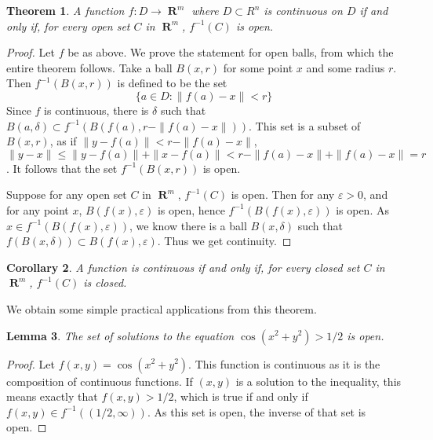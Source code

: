 \documentclass{report}
\newtheorem{theorem}{Theorem}[chapter]
\newtheorem{lemma}[theorem]{Lemma}
\newtheorem{corollary}[theorem]{Corollary}
\DeclareMathOperator{\real}{\mathbf{R}}
\begin{document}
\begin{theorem}
  A function $f:D \to \real^m$ where $D \subset R^n$ is continuous on $D$ if and only if, for every open set $C$ in $\real^m$, $f^{-1}(C)$ is open.
\end{theorem}
\begin{proof}
  Let $f$ be as above. We prove the statement for open balls, from which the entire theorem follows. Take a ball $B(x,r)$ for some point $x$ and some radius $r$. Then $f^{-1}(B(x,r))$ is defined to be the set
  \[ \{ a \in D : \| f(a) - x \| < r \} \]
  Since $f$ is continuous, there is $\delta$ such that $B(a,\delta) \subset f^{-1}(B(f(a),r - \|f(a) - x \|))$. This set is a subset of $B(x,r)$, as if $\| y - f(a) \| < r - \| f(a) - x \|$, $\| y - x\| \leq \| y - f(a) \| + \| x - f(a) \| < r - \| f(a) - x \| + \| f(a) - x \| = r$. It follows that the set $f^{-1}(B(x,r))$ is open.

  Suppose for any open set $C$ in $\real^m$, $f^{-1}(C)$ is open. Then for any $\varepsilon > 0$, and for any point $x$, $B(f(x), \varepsilon)$ is open, hence $f^{-1}(B(f(x), \varepsilon))$ is open. As $x \in f^{-1}(B(f(x), \varepsilon))$, we know there is a ball $B(x, \delta)$ such that $f(B(x, \delta)) \subset B(f(x), \varepsilon)$. Thus we get continuity.
\end{proof}

\begin{corollary}
  A function is continuous if and only if, for every closed set $C$ in $\real^m$, $f^{-1}(C)$ is closed.
\end{corollary}

We obtain some simple practical applications from this theorem.

\begin{lemma}
  The set of solutions to the equation $\cos(x^2 + y^2) > 1/2$ is open.
\end{lemma}
\begin{proof}
  Let $f(x,y) = \cos(x^2 + y^2)$. This function is continuous as it is the composition of continuous functions. If $(x,y)$ is a solution to the inequality, this means exactly that $f(x,y) > 1/2$, which is true if and only if $f(x,y) \in f^{-1}((1/2, \infty))$. As this set is open, the inverse of that set is open.
 \end{proof}
\end{document}
